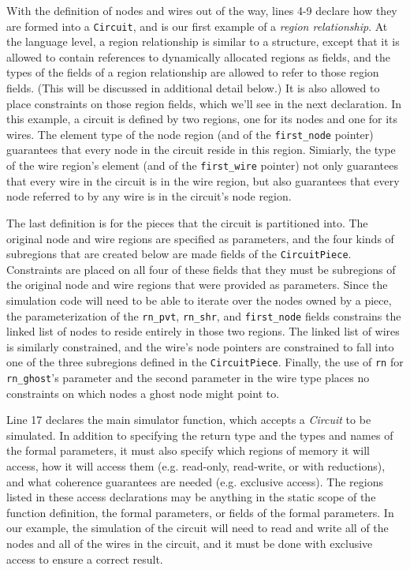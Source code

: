 With the definition of nodes and wires out of the way, lines 4-9 declare how
they are formed into a {\tt Circuit}, and is our first example of a
\emph{region relationship}.  At the language level, a region relationship is
similar to a structure, except that it is allowed to contain references to
dynamically allocated regions as fields, and the types of the fields of a region
relationship are allowed to refer to those region fields.  (This will be 
discussed in additional detail below.)  It is also allowed
to place constraints on those region fields, which we'll see in the next
declaration.  In this example, a circuit is defined
by two regions, one for its nodes and one for its wires.  The element type of
the node region (and of the {\tt first\_node} pointer) guarantees that every
node in the circuit reside in this region.  Simiarly, the type of the wire
region's element (and of the {\tt first\_wire} pointer) not only guarantees
that every wire in the circuit is in the wire region, but also guarantees that
every node referred to by any wire is in the circuit's node region.

The last definition is for the pieces that the circuit is partitioned into.
The original node and wire regions are specified as parameters, and the
four kinds of subregions that are created below are made fields of the
{\tt CircuitPiece}.  Constraints are placed on all four of these fields that
they must be subregions of the original node and wire regions that were
provided as parameters.  Since the simulation code will need to be able to
iterate over the nodes owned by a piece, the parameterization of the {\tt rn\_pvt},
{\tt rn\_shr}, and {\tt first\_node} fields constrains the linked list of
nodes to reside entirely in those two regions.  The linked list of wires is
similarly constrained, and the wire's node pointers are constrained to fall
into one of the three subregions defined in the {\tt CircuitPiece}.  Finally,
the use of {\tt rn} for {\tt rn\_ghost}'s parameter and the second parameter
in the wire type places no constraints on which nodes a ghost node might point
to.

Line 17 declares the main simulator function, which accepts a \emph{Circuit}
to be simulated.  In addition to specifying the return type and the types and
names of the formal parameters, it must also specify which regions of memory
it will access, how it will access them (e.g. read-only, read-write, or with
reductions), and what coherence guarantees are needed (e.g. exclusive access).
The regions listed in these access declarations may be anything in the static
scope of the function definition, the formal parameters, or fields of the formal
parameters.  In our example, the simulation of the circuit will need to read
and write all of the nodes and all of the wires in the circuit, and it must
be done with exclusive access to ensure a correct result.

